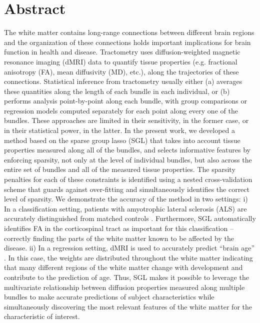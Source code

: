 \section*{Abstract}

The white matter contains long-range connections between different
brain regions and the organization of these connections holds important
implications for brain function in health and disease. Tractometry
uses diffusion-weighted magnetic resonance imaging (dMRI) data
to quantify tissue properties (e.g. fractional anisotropy (FA),
mean diffusivity (MD), etc.), along the trajectories of these
connections\cite{yeatman2012tract}. Statistical inference from
tractometry usually either (a) averages these quantities along
the length of each bundle in each individual, or (b) performs analysis
point-by-point along each bundle, with group comparisons or regression
models computed separately for each point along every one of the bundles.
These approaches are limited in their sensitivity, in the former case, or
in their statistical power, in the latter.
In the present work, we developed a method based on the sparse group
lasso (SGL) \cite{simon2013sparse} that takes into account tissue
properties measured along all of the bundles, and selects informative
features by enforcing sparsity, not only at the level of individual
bundles, but also across the entire set of bundles and all of the measured
tissue properties. The sparsity penalties for each of these constraints
is identified using a nested cross-validation scheme that guards
against over-fitting and simultaneously identifies the correct
level of sparsity. We demonstrate the accuracy of the method in two
settings: i) In a classification setting, patients with amyotrophic
lateral sclerosis (ALS) are accurately distinguished from matched
controls \cite{sarica2017corticospinal}. Furthermore, SGL automatically
identifies FA in the corticospinal tract as important for this
classification -- correctly finding the parts of the white matter known
to be affected by the disease. ii) In a regression setting, dMRI is
used to accurately predict ``brain age'' \cite{yeatman2014lifespan,
Brown2012-so}. In this case, the weights are distributed throughout the
white matter indicating that many different regions of the white matter
change with development and contribute to the prediction of age. Thus,
SGL makes it possible to leverage the multivariate relationship between
diffusion properties measured along multiple bundles to make accurate
predictions of subject characteristics while simultaneously discovering
the most relevant features of the white matter for the characteristic of
interest.

